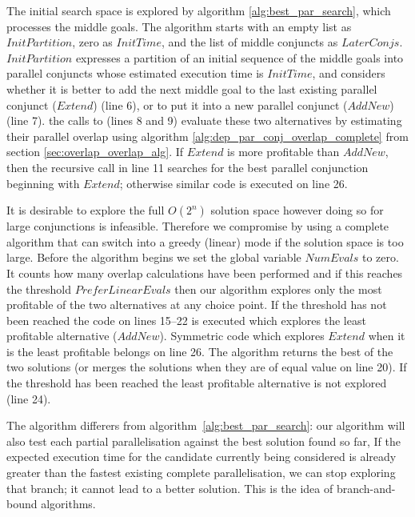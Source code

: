 The initial search space is explored by
algorithm \ref{alg:best_par_search}, which processes the middle goals.
The algorithm starts with an empty list as  $InitPartition$,
zero as $InitTime$, and the list of middle conjuncts as $LaterConjs$.
$InitPartition$ expresses a partition of an initial sequence
of the middle goals into parallel conjuncts
whose estimated execution time is $InitTime$,
and considers whether it is better to add the next middle goal
to the last existing parallel conjunct ($Extend$) (line 6),
or to put it into a new parallel conjunct ($AddNew$) (line 7).
the calls to \findpartime (lines 8 and 9) evaluate these two alternatives by
estimating their parallel overlap using 
algorithm \ref{alg:dep_par_conj_overlap_complete}
from section \ref{sec:overlap_overlap_alg}.
If $Extend$ is more profitable than $AddNew$,
then the recursive call in line 11 searches for the best parallel
conjunction beginning with $Extend$;
otherwise similar code is executed on line 26.

It is desirable to explore the full $O(2^n)$ solution space however doing so
for large conjunctions is infeasible.
Therefore we compromise by using a complete algorithm that can switch into a
greedy (linear) mode if the solution space is too large.
Before the algorithm begins we set the global variable $NumEvals$ to zero.
It counts how many overlap calculations have been performed 
and if this reaches the threshold $PreferLinearEvals$ then our algorithm
explores only the most profitable of the two alternatives at any choice
point.
If the threshold has not been reached the code on lines 15--22 is executed
which explores the least profitable alternative ($AddNew$).
Symmetric code which explores $Extend$ when it is the least profitable
belongs on line 26.
The algorithm returns the best of the two solutions
(or merges the solutions when they are of equal value on line 20).
If the threshold has been reached the least profitable alternative is not
explored (line 24).

The algorithm differers from algorithm~\ref{alg:best_par_search}:
our algorithm will also test each partial parallelisation against the best
solution found so far,
If the expected execution time for the candidate currently being considered
is already greater than the fastest existing complete parallelisation,
we can stop exploring that branch;
it cannot lead to a better solution.
This is the idea of branch-and-bound algorithms.

